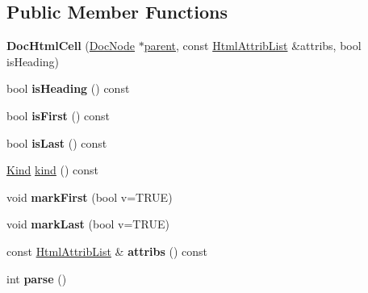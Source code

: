 \subsection*{Public Member Functions}
\begin{DoxyCompactItemize}
\item 
\mbox{\label{class_doc_html_cell_a408005d09b36012a9aa432df386a8ed0}} 
{\bfseries Doc\+Html\+Cell} (\mbox{\hyperlink{class_doc_node}{Doc\+Node}} $\ast$\mbox{\hyperlink{class_doc_node_a73e8ad29a91cfceb0968eb00db71a23d}{parent}}, const \mbox{\hyperlink{class_html_attrib_list}{Html\+Attrib\+List}} \&attribs, bool is\+Heading)
\item 
\mbox{\label{class_doc_html_cell_ace62c55c933434c4f451847fede71851}} 
bool {\bfseries is\+Heading} () const
\item 
\mbox{\label{class_doc_html_cell_a3f5ca6db8eaa23b261bbe688bc652644}} 
bool {\bfseries is\+First} () const
\item 
\mbox{\label{class_doc_html_cell_ac61b0f67d380a5ce45f5015e122bc34b}} 
bool {\bfseries is\+Last} () const
\item 
\mbox{\hyperlink{class_doc_node_aebd16e89ca590d84cbd40543ea5faadb}{Kind}} \mbox{\hyperlink{class_doc_html_cell_a344128532d6fb2eed59389c843b3d473}{kind}} () const
\item 
\mbox{\label{class_doc_html_cell_ab472d7aee599717c94c69ab137310d2c}} 
void {\bfseries mark\+First} (bool v=T\+R\+UE)
\item 
\mbox{\label{class_doc_html_cell_a50c10a42581d4ae558776aa2d7528cd2}} 
void {\bfseries mark\+Last} (bool v=T\+R\+UE)
\item 
\mbox{\label{class_doc_html_cell_aac37591897467fbf1c9778c46c571673}} 
const \mbox{\hyperlink{class_html_attrib_list}{Html\+Attrib\+List}} \& {\bfseries attribs} () const
\item 
\mbox{\label{class_doc_html_cell_ad1dda118e2ea47235f3880e56ae6e2a8}} 
int {\bfseries parse} ()
\item 
\mbox{\label{class_doc_html_cell_aa5b43dd579348e1e8e4df010176bd928}} 

\end{DoxyCompactItemize}
